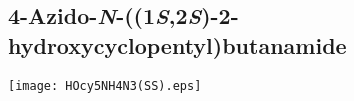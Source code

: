 %
%

%
%




\subsection{4\hyp{}Azido\hyp{}\textit{N}\hyp{}((1\textit{S},2\textit{S})\hyp{}2\hyp{}hydroxycyclopentyl)butanamide } 


\begin{scheme}[H]
	\begin{center}
		\texttt{[image: HOcy5NH4N3(SS).eps]}
	\end{center}
\end{scheme}

